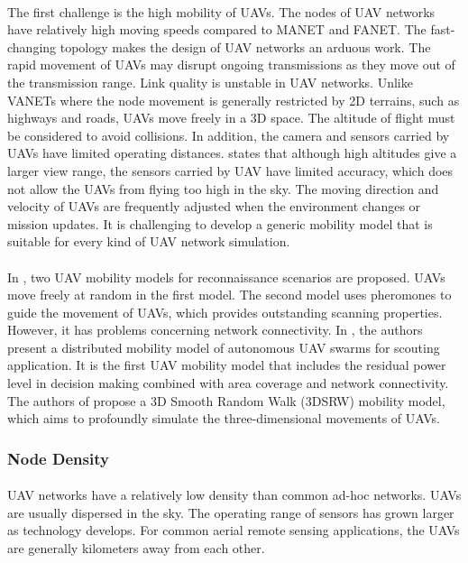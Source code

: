 \documentclass[a4paper,12pt]{report}
\begin{document}
\paragraph{}
The first challenge is the high mobility of UAVs. The nodes of UAV networks have relatively high moving speeds compared to MANET and FANET. The fast-changing topology makes the design of UAV networks an arduous work. The rapid movement of UAVs may disrupt ongoing transmissions as they move out of the transmission range. Link quality is unstable in UAV networks. Unlike VANETs where the node movement is generally restricted by 2D terrains, such as highways and roads, UAVs move freely in a 3D space. The altitude of flight must be considered to avoid collisions. In addition, the camera and sensors carried by UAVs have limited operating distances.\cite{Goodrich2008SupportingWS} states that although high altitudes give a larger view range, the sensors carried by UAV have limited accuracy, which does not allow the UAVs from flying too high in the sky. The moving direction and velocity of UAVs are frequently adjusted when the environment changes or mission updates. It is challenging to develop a generic mobility model that is suitable for every kind of UAV network simulation. 

\paragraph{}
In \cite{4124182}, two UAV mobility models for reconnaissance scenarios are proposed. UAVs move freely at random in the first model. The second model uses pheromones to guide the movement of UAVs, which provides outstanding scanning properties. However, it has problems concerning network connectivity. In \cite{7565125}, the authors present a distributed mobility model of autonomous UAV swarms for scouting application. It is the first UAV mobility model that includes the residual power level in decision making combined with area coverage and network connectivity. The authors of \cite{8855467} propose a 3D Smooth Random Walk (3DSRW) mobility model, which aims to profoundly simulate the three-dimensional movements of UAVs.

\subsubsection{Node Density}
\paragraph{}
UAV networks have a relatively low density than common ad-hoc networks. UAVs are usually dispersed in the sky. The operating range of sensors has grown larger as technology develops. For common aerial remote sensing applications, the UAVs are generally kilometers away from each other.
\end{document}

